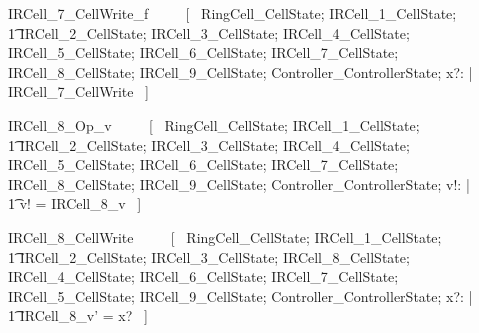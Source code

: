 \documentclass{article}
\begin{document}
\begin{zed}
IRCell\_7\_CellWrite\_f ~~~~ [~ 
    \Xi RingCell\_CellState; 
    \Xi IRCell\_1\_CellState; \\
    \t1 \Xi IRCell\_2\_CellState; 
    \Xi IRCell\_3\_CellState;
    \Xi IRCell\_4\_CellState; 
    \Xi IRCell\_5\_CellState; 
    \Xi IRCell\_6\_CellState; 
    \Xi IRCell\_7\_CellState; 
    \Xi IRCell\_8\_CellState; 
    \Xi IRCell\_9\_CellState; 
    \Xi Controller\_ControllerState; 
    x?: \nat | \\
    \lnot \pre IRCell\_7\_CellWrite ~] \\
\end{zed}
\begin{zed}
IRCell\_8\_Op\_v ~~~~ [~ 
    \Xi RingCell\_CellState; 
    \Xi IRCell\_1\_CellState; \\
    \t1 \Xi IRCell\_2\_CellState; 
    \Xi IRCell\_3\_CellState;
    \Xi IRCell\_4\_CellState; 
    \Xi IRCell\_5\_CellState; 
    \Xi IRCell\_6\_CellState; 
    \Xi IRCell\_7\_CellState; 
    \Xi IRCell\_8\_CellState; 
    \Xi IRCell\_9\_CellState; 
    \Xi Controller\_ControllerState; v!: \nat | \\
    \t1 v! = IRCell\_8\_v ~] \\
\end{zed}

\begin{zed}
IRCell\_8\_CellWrite ~~~~ [~ 
    \Xi RingCell\_CellState; 
    \Xi IRCell\_1\_CellState; \\
    \t1 \Xi IRCell\_2\_CellState; 
    \Xi IRCell\_3\_CellState; 
    \Delta IRCell\_8\_CellState;
    \Xi IRCell\_4\_CellState; 
    \Xi IRCell\_6\_CellState; 
    \Xi IRCell\_7\_CellState; 
    \Xi IRCell\_5\_CellState; 
    \Xi IRCell\_9\_CellState; 
    \Xi Controller\_ControllerState; 
    x?: \nat | \\
    \t1 IRCell\_8\_v' = x? ~] \\
\end{zed}
\end{document}

